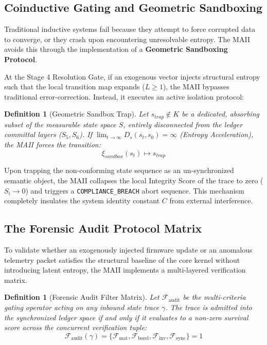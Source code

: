 \documentclass[11pt,a4paper]{article}
\newtheorem{definition}[theorem]{Definition}
\begin{document}
\subsection{Coinductive Gating and Geometric Sandboxing}
Traditional inductive systems fail because they attempt to force corrupted data to converge, or they crash upon encountering unresolvable entropy. The MAII avoids this through the implementation of a \textbf{Geometric Sandboxing Protocol}.

At the Stage 4 Resolution Gate, if an exogenous vector injects structural entropy such that the local transition map expands ($L \ge 1$), the MAII bypasses traditional error-correction. Instead, it executes an active isolation protocol:

\begin{definition}[Geometric Sandbox Trap]
Let $s_{trap} \notin K$ be a dedicated, absorbing subset of the measurable state space $S$, entirely disconnected from the ledger committal layers ($S_5, S_6$). If $\lim_{t \to \infty} D_s(s_t, s_0) = \infty$ (Entropy Acceleration), the MAII forces the transition:
\begin{equation}
    \xi_{sandbox}(s_t) \mapsto s_{trap}
\end{equation}
\end{definition}

Upon trapping the non-conforming state sequence as an un-synchronized semantic object, the MAII collapses the local Integrity Score of the trace to zero ($S_i \to 0$) and triggers a \texttt{COMPLIANCE\_BREACH} abort sequence. This mechanism completely insulates the system identity constant $C$ from external interference.

\subsection{The Forensic Audit Protocol Matrix}
To validate whether an exogenously injected firmware update or an anomalous telemetry packet satisfies the structural baseline of the core kernel without introducing latent entropy, the MAII implements a multi-layered verification matrix. 

\begin{definition}[Forensic Audit Filter Matrix]
Let $\mathcal{F}_{\text{audit}}$ be the multi-criteria gating operator acting on any inbound state trace $\gamma$. The trace is admitted into the synchronized ledger space if and only if it evaluates to a non-zero survival score across the concurrent verification tuple:
\begin{equation}
    \mathcal{F}_{\text{audit}}(\gamma) = \{ \mathcal{F}_{\text{mat}}, \mathcal{F}_{\text{borel}}, \mathcal{F}_{\text{inv}}, \mathcal{F}_{\text{sync}} \} = 1
\end{equation}
\end{definition}
\end{document}
